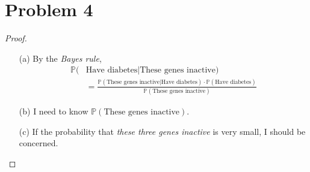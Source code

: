 \documentclass{article}
\begin{document}
\section*{Problem 4}
    \begin{proof}
        \indent
        \begin{itemize}
            \item[(a)]
                By the \textit{Bayes rule},
                \begin{align*}
                    \mathbb{P}(&\text{Have diabetes}|\text{These genes inactive})\\
                    &= \frac{\mathbb{P}(\text{These genes inactive}|\text{Have diabetes})\cdot \mathbb{P}(\text{Have diabetes})}{\mathbb{P}(\text{These genes inactive})}
                \end{align*}
            \item[(b)]
            I need to know $\mathbb{P}(\text{These genes inactive})$.
            \item[(c)]
                If the probability that \textit{these three genes inactive} is very small,
                I should be concerned.
        \end{itemize}
    \end{proof}

\end{document}
